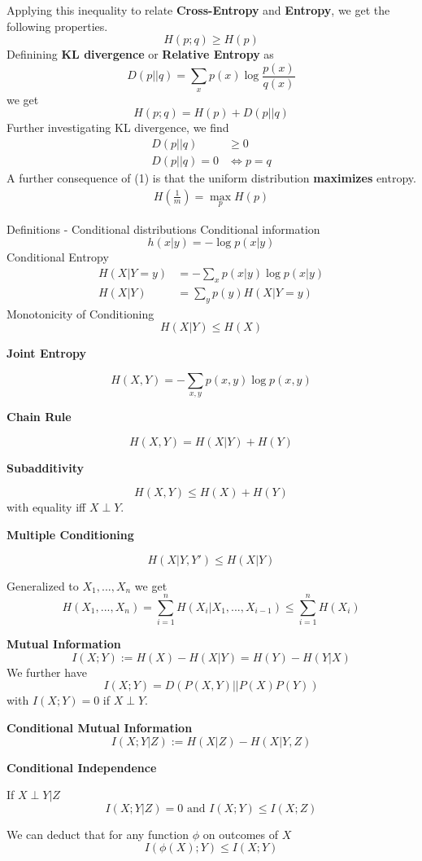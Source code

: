Applying this inequality to relate \textbf{Cross-Entropy} and \textbf{Entropy}, we get the following properties.
\[H(p; q) \geq H(p)\]
    Definining \textbf{KL divergence} or \textbf{Relative Entropy} as
    \[D(p || q) = \sum_{x} p(x) \log \frac{p(x)}{q(x)}\]
    we get
    \[H(p; q) = H(p) + D(p || q)\]
    Further investigating KL divergence, we find 
    \begin{align}
        D(p||q) &\geq 0\\
        D(p||q) = 0 &\iff p = q
    \end{align}
    A further consequence of (1) is that the uniform distribution \textbf{maximizes} entropy.
    \begin{align*}
        H\left(\frac{1}{m}\right) = \max_{p}H(p)
    \end{align*}
    \begin{mainbox}
        {Definitions - Conditional distributions}
        Conditional information
        \[h(x|y) = - \log p(x|y)\]
        Conditional Entropy
        \begin{align*}
            H(X | Y = y) &= - \sum_{x}p(x|y) \log p(x|y)\\
            H(X|Y) &= \sum_{y} p(y)H(X|Y = y)
        \end{align*}
        Monotonicity of Conditioning
        \[H(X|Y) \leq H(X)\]
    \end{mainbox}
    \textbf{Joint Entropy}

    \[H(X, Y) = - \sum_{x, y}p(x,y) \log p(x, y)\]

    \textbf{Chain Rule}

    \[H(X, Y) = H(X | Y) + H(Y)\]

    \textbf{Subadditivity}

    \[H(X, Y) \leq H(X) + H(Y)\]
    with equality iff \(X \perp Y\).

    \textbf{Multiple Conditioning}

    \[H(X | Y, Y') \leq H(X|Y)\]

    Generalized to \(X_1, ..., X_n\) we get
    \[H(X_1, ..., X_n) = \sum_{i = 1}^n H(X_i | X_1, ..., X_{i-1}) \leq \sum_{i = 1}^n H(X_i)\]

    \textbf{Mutual Information}
    \[I(X; Y) := H(X) - H(X|Y) = H(Y) - H(Y|X)\]
    We further have 
    \[I(X; Y) = D(P(X, Y) || P(X)P(Y))\]
    with \(I(X;Y) = 0\) if \(X \perp Y\).

    \textbf{Conditional Mutual Information}
    \[I(X; Y|Z) := H(X|Z) - H(X|Y, Z)\]

    \textbf{Conditional Independence}
    
    If \(X \perp Y|Z\) 
    \[I(X; Y | Z) = 0 \text{ and }I(X;Y) \leq I(X;Z)\]

    We can deduct that for any function \(\phi\) on outcomes of \(X\)
    \[I(\phi(X); Y) \leq I(X;Y)\]





